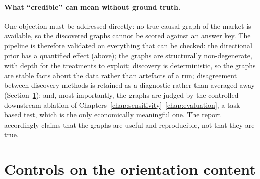\paragraph{What ``credible'' can mean without ground truth.} One objection
must be addressed directly: no true causal graph of the market is
available, so the
discovered graphs cannot be scored against an answer key. The pipeline is
therefore validated on everything that can be checked: the
directional prior has a quantified effect (above); the graphs are
structurally non-degenerate, with depth for the treatments to
exploit; discovery is deterministic, so the graphs are stable
facts about the data rather than artefacts of a run; disagreement between
discovery methods is retained as a diagnostic rather than averaged away
(Section~\ref{sec:comparators}); and, most importantly, the graphs are
judged by the controlled downstream ablation of
Chapters~\ref{chap:sensitivity}--\ref{chap:evaluation}, a task-based
test, which is the only economically meaningful one. The report accordingly
claims that the graphs are useful and reproducible, not that they
are true.

\section{Controls on the orientation content}
\label{sec:comparators}


